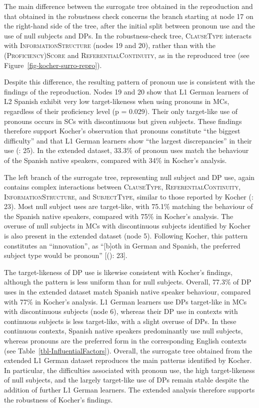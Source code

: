 \documentclass[
  letterpaper,
  DIV=11,
  numbers=noendperiod]{scrartcl}
\begin{document}
\newpage{}

The main difference between the surrogate tree obtained in the
reproduction and that obtained in the robustness check concerns the
branch starting at node 17 on the right-hand side of the tree, after the
initial split between pronoun use and the use of null subjects and DPs.
In the robustness-check tree, \textsc{ClauseType} interacts with
\textsc{InformationStructure} (nodes 19 and 20), rather than with the
(\textsc{Proficiency)Score} and \textsc{ReferentialContinuity,} as in
the reproduced tree (see Figure~\ref{fig-kocher-surro-repro}).

Despite this difference, the resulting pattern of pronoun use is
consistent with the findings of the reproduction. Nodes 19 and 20 show
that L1 German learners of L2 Spanish exhibit very low target-likeness
when using pronouns in MCs, regardless of their proficiency level (p =
0.029). Their only target-like use of pronouns occurs in SCs with
discontinuous but given subjects. These findings therefore support
Kocher's observation that pronouns constitute ``the biggest difficulty''
and that L1 German learners show ``the largest discrepancies'' in their
use (: 25). In the extended
dataset, 33.3\% of pronoun uses match the behaviour of the Spanish
native speakers, compared with 34\% in Kocher's analysis.

The left branch of the surrogate tree, representing null subject and DP
use, again contains complex interactions between \textsc{ClauseType,
ReferentialContinuity, InformationStructure,} and \textsc{SubjectType,}
similar to those reported by Kocher
(: 23). Most null subject uses
are target-like, with 75.1\% matching the behaviour of the Spanish
native speakers, compared with 75\% in Kocher's analysis. The overuse of
null subjects in MCs with discontinuous subjects identified by Kocher is
also present in the extended dataset (node 5). Following Kocher, this
pattern constitutes an ``innovation'', as ``{[}b{]}oth in German and
Spanish, the preferred subject type would be pronoun''
{[}(): 23{]}.

The target-likeness of DP use is likewise consistent with Kocher's
findings, although the pattern is less uniform than for null subjects.
Overall, 77.3\% of DP uses in the extended dataset match Spanish native
speaker behaviour, compared with 77\% in Kocher's analysis. L1 German
learners use DPs target-like in MCs with discontinuous subjects (node
6), whereas their DP use in contexts with continuous subjects is less
target-like, with a slight overuse of DPs. In these continuous contexts,
Spanish native speakers predominantly use null subjects, whereas
pronouns are the preferred form in the corresponding English contexts
(see Table~\ref{tbl-InfluentialFactors}). Overall, the surrogate tree
obtained from the extended L1 German dataset reproduces the main
patterns identified by Kocher. In particular, the difficulties
associated with pronoun use, the high target-likeness of null subjects,
and the largely target-like use of DPs remain stable despite the
addition of further L1 German learners. The extended analysis therefore
supports the robustness of Kocher's findings.
\end{document}
